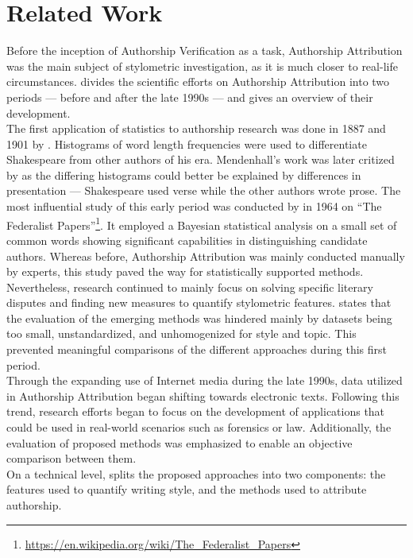 \chapter{Related Work}\label{related_work}
Before the inception of Authorship Verification as a task, Authorship Attribution was the main subject of stylometric investigation, as it is much closer to real-life circumstances.
\cite{stamatatos2009survey} divides the scientific efforts on Authorship Attribution into two periods --- before and after the late 1990s --- and gives an overview of their development.\\
The first application of statistics to authorship research was done in 1887 and 1901 by \citeauthor{mendenhall1887characteristic}.
Histograms of word length frequencies were used to differentiate Shakespeare from other authors of his era.
Mendenhall's work was later critized by \cite{williams1975mendenhall} as the differing histograms could better be explained by differences in presentation --- Shakespeare used verse while the other authors wrote prose.
The most influential study of this early period was conducted by \citeauthor{mosteller1964inference} in 1964 on ``The Federalist Papers''\footnote{\url{https://en.wikipedia.org/wiki/The_Federalist_Papers}}.
It employed a Bayesian statistical analysis on a small set of common words showing significant capabilities in distinguishing candidate authors.
Whereas before, Authorship Attribution was mainly conducted manually by experts, this study paved the way for statistically supported methods.
Nevertheless, research continued to mainly focus on solving specific literary disputes and finding new measures to quantify stylometric features.
\citeauthor{stamatatos2009survey} states that the evaluation of the emerging methods was hindered mainly by datasets being too small, unstandardized, and unhomogenized for style and topic.
This prevented meaningful comparisons of the different approaches during this first period.\\
Through the expanding use of Internet media during the late 1990s, data utilized in Authorship Attribution began shifting towards electronic texts.
Following this trend, research efforts began to focus on the development of applications that could be used in real-world scenarios such as forensics or law.
Additionally, the evaluation of proposed methods was emphasized to enable an objective comparison between them.\\
On a technical level, \citeauthor{stamatatos2009survey} splits the proposed approaches into two components: the features used to quantify writing style, and the methods used to attribute authorship.
